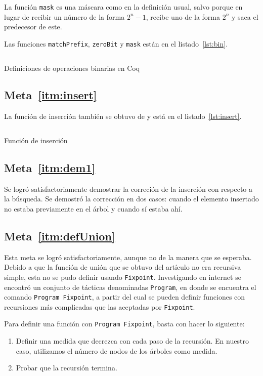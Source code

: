 \documentclass[11pt,letterpaper]{article}
\begin{document}
La función \texttt{mask} es una máscara como en la definición usual, salvo porque en lugar de recibir un número de la forma $2^n-1$, recibe uno de la forma $2^n$ y saca el predecesor de este.

Las funciones \texttt{matchPrefix}, \texttt{zeroBit} y \texttt{mask} están en el listado~\ref{lst:bin}.

\begin{listing}[H]
  \inputminted{coq}{src/bin.v}
  \caption{Definiciones de operaciones binarias en Coq}
  \label{lst:bin}
\end{listing}

\subsection{Meta~\ref{itm:insert}}
\noindent La función de inserción también se obtuvo de\cite{okasaki_fast_1998} y está en el listado~\ref{lst:insert}. 

\begin{listing}[H]
  \inputminted{coq}{src/insert.v}
  \caption{Función de inserción}
  \label{lst:insert}
\end{listing}

\subsection{Meta~\ref{itm:dem1}}
\noindent Se logró satisfactoriamente demostrar la correción de la inserción con respecto a la búsqueda. Se demostró la corrección en dos casos: cuando el elemento insertado no estaba previamente en el árbol y cuando sí estaba ahí.

\subsection{Meta~\ref{itm:defUnion}}
\noindent Esta meta se logró satisfactoriamente, aunque no de la manera que se esperaba. Debido a que la función de unión que se obtuvo del artículo no era recursiva simple, esta no se pudo definir usando \texttt{Fixpoint}. Investigando en internet se encontró un conjunto de tácticas denominadas \texttt{Program}\cite{noauthor_program_nodate}, en donde se encuentra el comando \texttt{Program Fixpoint}, a partir del cual se pueden definir funciones con recursiones más complicadas que las aceptadas por \texttt{Fixpoint}.

Para definir una función con \texttt{Program Fixpoint}, basta con hacer lo siguiente:

\begin{enumerate}
\item Definir una medida que decrezca con cada paso de la recursión. En nuestro caso, utilizamos el número de nodos de los árboles como medida.
\item Probar que la recursión termina.
\end{enumerate}
\end{document}

